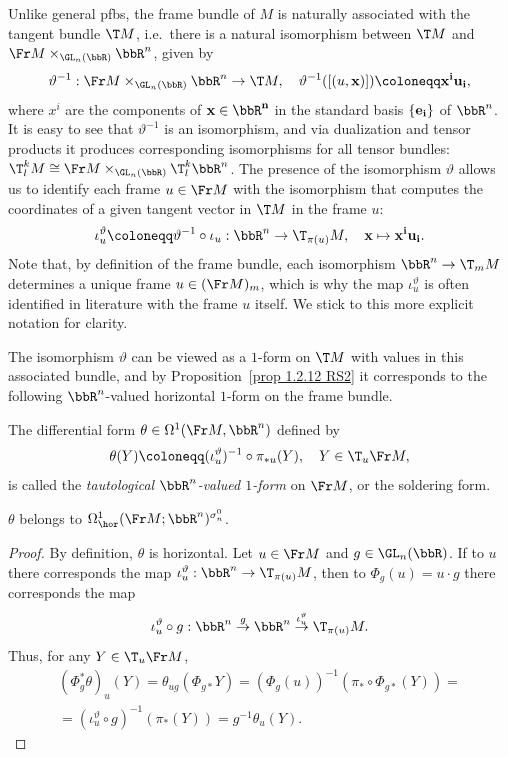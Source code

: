 Unlike general \glspl{pfb}, the frame bundle of $M$ is naturally associated with the tangent bundle $\T M$, i.e.\ there is a natural isomorphism between $\T M$ and  $\Fr M\times_{\GL_n(\bbR)}\bbR^n$, given by
\[\vartheta^{-1}:\Fr M \times_{\GL_n(\bbR)} \bbR^n\to \T M,\quad \vartheta^{-1}([(u,\bf{x})])\coloneqq x^iu_i,\label{eq 2.1.2 RS2}\]
where $x^i$ are the components of $\bf{x}\in\bbR^n$ in the standard basis $\{\bf{e}_i\}$ of $\bbR^n$. It is easy to see that $\vartheta^{-1}$ is an isomorphism, and via dualization and tensor products it produces corresponding isomorphisms for all tensor bundles: $\T^k_l M\cong \Fr M\times_{\GL_n(\bbR)}\T^k_l\bbR^n$. The presence of the isomorphism $\vartheta$ allows us to identify each frame $u\in \Fr M$ with the isomorphism that computes the coordinates of a given tangent vector in $\T M$ in the frame $u$:
\[\iota_u^\vartheta\coloneqq \vartheta^{-1}\circ\iota_u:\bbR^n\to \T_{\pi(u)}M,\quad \bf{x}\mapsto x^i u_i.\]
Note that, by definition of the frame bundle, each isomorphism $\bbR^n\to \T_mM$ determines a unique frame $u\in (\Fr M)_m$, which is why the map $\iota_u^\vartheta$ is often identified in literature with the frame $u$ itself. We stick to this more explicit notation for clarity.

The isomorphism $\vartheta$ can be viewed as a $1$-form on $\T M$ with values in this associated bundle, and by Proposition~\ref{prop 1.2.12 RS2} it corresponds to the following $\bbR^n$-valued horizontal $1$-form on the frame bundle.

\begin{defn}
    The differential form $\theta\in\Omega^1(\Fr M,\bbR^n)$ defined by
    \[\theta(Y)\coloneqq (\iota_u^\vartheta)^{-1}\circ\pi_{\ast u}(Y),\quad Y\in \T_u\Fr M,\]
    is called the \emph{tautological $\bbR^n$-valued $1$-form} on $\Fr M$, or the soldering form.
\end{defn}


\begin{prop}[{{\cite[Prop.~2.1.4]{RS2}}}]\label{prop 2.1.4 RS2}
    $\theta$ belongs to $\Omega^1_{\hor}(\Fr M; \bbR^n)^{\sigma_n^0}$.
\end{prop}
\begin{proof}
    By definition, $\theta$ is horizontal. Let $u\in\Fr M$ and $g\in \GL_n(\bbR)$. If to $u$ there corresponds the map $\iota^\vartheta_u:\bbR^n\to \T_{\pi(u)}M$, then to $\Phi_g(u)=u\cdot g$ there corresponds the map
    \[\iota_u^\vartheta\circ g:\bbR^n\overset{g}{\to} \bbR^n\overset{\iota_u^\vartheta}{\to} \T_{\pi(u)}M.\] 
    Thus, for any $Y\in \T_u \Fr M$,
    \begin{multline}
        (\Phi^\ast_g \theta)_u(Y)=\theta_{ug}(\Phi_{g\ast}Y)=(\Phi_g(u))^{-1}(\pi_\ast\circ \Phi_{g\ast}(Y))=\\
        =(\iota_u^\vartheta\circ g)^{-1}(\pi_\ast (Y))=g^{-1}\theta_u(Y).
    \end{multline}
\end{proof}

